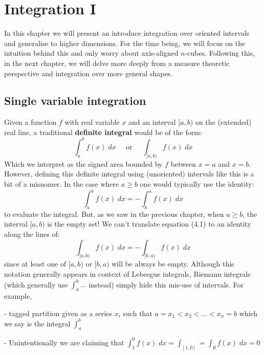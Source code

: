 \chapter{Integration I}

In this chapter we will present an introduce integration over oriented intervals and generalise to higher dimensions.
For the time being, we will focus on the intuition behind this and only worry about axis-aligned $n$-cubes.
Following this, in the next chapter, we will delve more deeply from a measure theoretic perspective and integration over more general shapes.

\section{Single variable integration}

Given a function $f$ with real variable $x$ and an interval $[a,b)$ on the (extended) real line, 
a traditional \textbf{definite integral} would be of the form:
\begin{equation*}
	\int_a^b f(x) \; dx \;\;\;\;\; \text{or} \;\;\;\;\; \int_{[a,b)} f(x) \; dx
\end{equation*}
Which we interpret as the signed area bounded by $f$ between $x=a$ and $x=b$.
However, defining this definite integral using (unoriented) intervals like this is a bit of a misnomer.
In the case where $a \geq b$ one would typically use the identity:
\begin{equation}
	\int_a^b f(x) \; dx = - \int_b^a f(x) \; dx
\end{equation}
to evaluate the integral.
But, as we saw in the previous chapter, when $a \geq b$, the interval $[a,b)$ is the empty set!
We can't translate equation (4.1) to an identity along the lines of:
\begin{equation}
	\int_{[a,b)} f(x) \; dx = - \int_{[b,a)} f(x) \; dx
\end{equation}
since at least one of $[a,b)$ or $[b,a)$ will be always be empty.
Although this notation generally appears in context of Lebesgue integrals, 
Riemann integrals (which generally use $\int_a^b ...$ instead) simply hide this mis-use of intervals.
For example, 

- tagged partition given as a series $x_i$ such that $a = x_1 < x_2 < ... < x_n = b$ which we say is the integral $\int_a^b$

- Unintentionally we are claiming that $\int_1^0 f(x) \; dx = \int_{[1,0]}= \int_{\emptyset} f(x) \; dx = 0$

